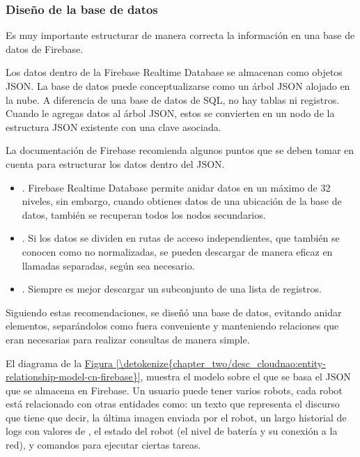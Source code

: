 \subsubsection{Diseño de la base de datos}
\label{\detokenize{chapter_two/desc_cloudnao:diseno-de-la-base-de-datos}}
Es muy importante estructurar de manera correcta la información en una base
de datos de Firebase.

Los datos dentro de la Firebase Realtime Database se almacenan como objetos
JSON. La base de datos puede conceptualizarse como un árbol JSON alojado en la
nube. A diferencia de una base de datos de SQL, no hay tablas ni registros.
Cuando le agregas datos al árbol JSON, estos se convierten en un nodo de la
estructura JSON existente con una clave asociada.

La documentación de Firebase recomienda algunos puntos que se deben tomar
en cuenta para estructurar los datos dentro del JSON.
\begin{itemize}
\item {} 
. Firebase Realtime Database permite anidar datos en un máximo de 32 niveles, sin embargo, cuando obtienes datos de una ubicación de la base de datos, también se recuperan todos los nodos secundarios.

\item {} 
. Si los datos se dividen en rutas de acceso independientes, que también se conocen como no normalizadas, se pueden descargar de manera eficaz en llamadas separadas, según sea necesario.

\item {} 
. Siempre es mejor descargar un subconjunto de una lista de registros.

\end{itemize}

Siguiendo estas recomendaciones, se diseñó una base de datos, evitando anidar
elementos, separándolos como fuera conveniente y manteniendo relaciones que
eran necesarias para realizar consultas de manera simple.

El diagrama de la \hyperref[\detokenize{chapter_two/desc_cloudnao:entity-relationship-model-cn-firebase}]{Figura \ref{\detokenize{chapter_two/desc_cloudnao:entity-relationship-model-cn-firebase}}}, muestra el
modelo sobre el que se basa el JSON que se almacena en Firebase.
Un usuario puede tener varios robots, cada robot está relacionado
con otras entidades como: un texto que representa el discurso que tiene que decir,
la última imagen enviada por el robot, un largo historial de
logs con valores de , el estado del robot (el nivel de batería y
su conexión a la red), y comandos para ejecutar ciertas tareas.

